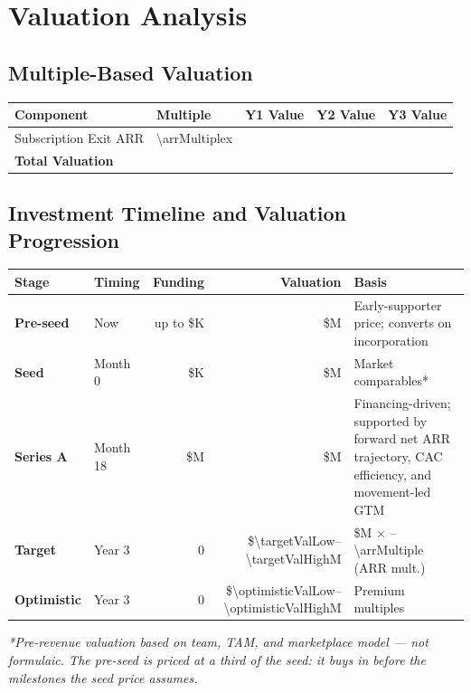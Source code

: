 
\section{Valuation Analysis}

\subsection{Multiple-Based Valuation}
\begin{table}[H]
\centering
\begin{tabularx}{\linewidth}{l Y Y Y Y}
\toprule
Component & Multiple\cite{highalpha2024,openview2023} & Y1 Value & Y2 Value & Y3 Value \\\midrule
Subscription Exit ARR & \num{\arrMultiple}x & \numint{\subARRYearOne * \arrMultiple} & \numint{\subARRYearTwo * \arrMultiple} & \numint{\subARRYearThree * \arrMultiple} \\\midrule
\textbf{Total Valuation} &  & \textbf{\numint{\subARRYearOne * \arrMultiple}} & \textbf{\numint{\subARRYearTwo * \arrMultiple}} & \textbf{\numint{\subARRYearThree * \arrMultiple}} \\
\bottomrule
\end{tabularx}
\end{table}

\subsection{Investment Timeline and Valuation Progression}
\begin{table}[H]
\centering
\begin{tabularx}{\linewidth}{l l r r L}
\toprule
Stage & Timing & Funding & Valuation & Basis \\\midrule
\textbf{Pre-seed} & Now & up to \$K & \$M & Early-supporter price; converts on incorporation \\
\textbf{Seed} & Month 0 & \$K & \$M & Market comparables* \\
\textbf{Series A} & Month 18 & \$M & \$M & Financing-driven; supported by forward net ARR trajectory, CAC efficiency, and movement-led GTM \\
\textbf{Target} & Year 3 & 0 & \$\num{\targetValLow}--\num{\targetValHigh}M & \$M $\times$ \numfpeval{\targetARRMultiple}--\num{\arrMultiple} (ARR mult.) \\
\textbf{Optimistic} & Year 3 & 0 & \$\num{\optimisticValLow}--\num{\optimisticValHigh}M & Premium multiples \\
\bottomrule
\end{tabularx}
\end{table}
\textit{*Pre-revenue valuation based on team, TAM, and marketplace model --- not formulaic. The pre-seed is priced at a third of the seed: it buys in before the milestones the seed price assumes.}

